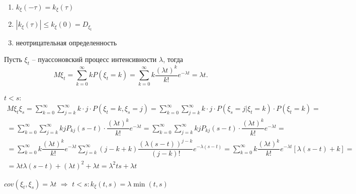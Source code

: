 \begin{enumerate}
  \item $k_\xi(-\tau) = k_\xi (\tau)$
  \item $|k_\xi(\tau)| \leqslant k_\xi(0) = D_{\xi_t}$
  \item неотрицательная определенность
\end{enumerate}

\begin{ex}
  Пусть $\xi_t$ -- пуассоновский процесс интенсивности $\lambda$, тогда
  \[
    M\xi_t = \sum_{k=0}^\infty k P(\xi_t = k) = \sum_{k=0}^\infty k \dfrac{(\lambda t)^k}{k!} e^{-\lambda t} = \lambda t.
  \]

  $t<s$:
  \begin{multline*}
    M\xi_t \xi_s = \sum_{k=0}^\infty \sum_{j=k}^\infty k\cdot j \cdot P(\xi_t = k, \xi_s = j)
    = \sum_{k=0}^\infty \sum_{j=k}^\infty k \cdot j \cdot P(\xi_s=j | \xi_t=k) \cdot P(\xi_t = k) = \\
    = \sum_{k=0}^\infty \sum_{j=k}^\infty kj P_{kj}(s-t) \cdot \dfrac{(\lambda t)^k}{k!} e^{-\lambda t}
    = \sum_{k=0}^\infty \sum_{j=k}^\infty kj P_{kj}(s-t) \cdot \dfrac{(\lambda t)^k}{k!} e^{-\lambda t} = \\
    = \sum_{k=0}^\infty k \dfrac{(\lambda t)^k}{k!} e^{-\lambda t}
    \sum_{j=k}^\infty (j-k+k) \dfrac{(\lambda(s-t))^{j-k}}{(j-k)!} e^{- \lambda (s-t)}
    = \sum_{k=0}^\infty k \dfrac{(\lambda t)^k}{k!} e^{-\lambda t} [\lambda(s-t) + k] = \\
    = \lambda t \lambda (s-t) + (\lambda t)^2 + \lambda t = \lambda^2 t s + \lambda t
  \end{multline*}

  $cov(\xi_t, \xi_s) = \lambda t$ $\Rightarrow$ $t < s : k_\xi (t, s) = \lambda \min(t, s)$
\end{ex}

